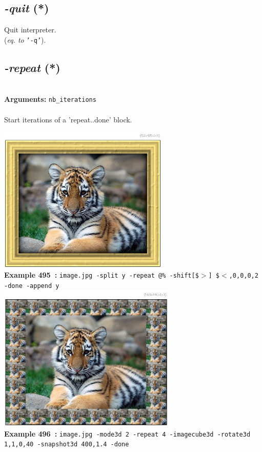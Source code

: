 \documentclass[a4paper,11pt,twoside]{book}
\begin{document}
\subsection{\emph{-quit} (*)}\vspace*{-0.5em}
Quit interpreter.
~\\(\emph{eq. to} {\small \texttt{'-q'}}).


\subsection{\emph{-repeat} (*)}\vspace*{-0.5em}
~\\\textbf{Arguments: } 
{\small \texttt{nb\_iterations}}\\~\\
Start iterations of a 'repeat..done' block.
\begin{center}\includegraphics[keepaspectratio=true,height=7cm,width=\textwidth]{img/gmic_def495.jpg}\\
{\footnotesize \textbf{Example 495~:} \texttt{image.jpg -split y -repeat @\% -shift[\$$>$] \$$<$,0,0,0,2 -done -append y}}
\\\includegraphics[keepaspectratio=true,height=7cm,width=\textwidth]{img/gmic_def496.jpg}\\
{\footnotesize \textbf{Example 496~:} \texttt{image.jpg -mode3d 2 -repeat 4 -imagecube3d -rotate3d 1,1,0,40 -snapshot3d 400,1.4 -done}}
\end{center}
\end{document}
